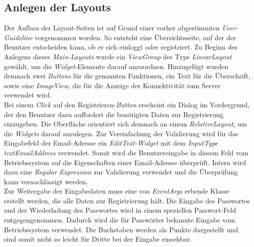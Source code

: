 \subsection{Anlegen der Layouts}
\label{ssec:nat-layouts}
Der Aufbau der Layout-Seiten ist auf Grund einer vorher abgestimmten \textit{User-Guideline} vorgenommen worden. So entsteht eine Übersichtsseite, auf der der Benutzer entscheiden kann, ob er sich einloggt oder registriert.
Zu Beginn des Anlegens dieses \textit{Main-Layouts} wurde ein \textit{ViewGroup} des Typs \textit{LinearLayout} gewählt, um die \textit{Widget}-Elemente darauf anzuordnen. Hinzugefügt wurden demnach zwei \textit{Buttons} für die genannten Funktionen, ein Text für die Überschrift, sowie eine \textit{ImageView}, die für die Anzeige der Konnektivität zum Server verwendet wird.\\
Bei einem \textit{Click} auf den Registrieren-\textit{Button} erscheint ein Dialog im Vordergrund, der den Benutzer dazu auffordert die benötigten Daten zur Registrierung einzugeben. Die Oberfläche orientiert sich demnach an einem \textit{RelativeLayout}, um die \textit{Widgets} darauf anzulegen. Zur Vereinfachung der Validierung wird für das Eingabefeld der Email-Adresse ein \textit{EditText-Widget} mit dem \textit{InputType} \textit{textEmailAddress} verwendet. Somit wird die Benutzereingabe in diesem Feld vom Betriebssystem auf die Eigenschaften einer Email-Adresse überprüft. Intern wird dazu eine \textit{Regular Expression} zur Validierung verwendet und die Überprüfung kann vernachlässigt werden.\\
Zur Weitergabe der Eingabedaten muss eine von \textit{EventArgs} erbende Klasse erstellt werden, die alle Daten zur Registrierung hält. Die Eingabe des Passwortes und der Wiederholung des Passwortes wird in einem speziellen Passwort-Feld entgegengenommen. Dadurch wird die für Passwörter bekannte Eingabe vom Betriebssystem verwendet. Die Buchstaben werden als Punkte dargestellt und sind somit nicht so leicht für Dritte bei der Eingabe einsehbar.\\
